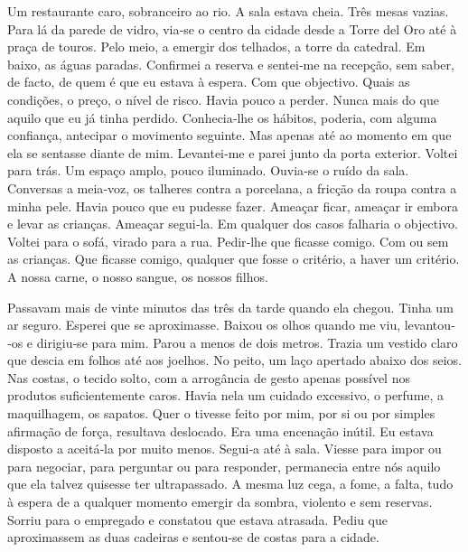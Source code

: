 Um restaurante caro, sobranceiro ao rio. A sala estava cheia. Três mesas
vazias. Para lá da parede de vidro, via­‑se o centro da cidade desde a
Torre del Oro até à praça de touros. Pelo meio, a emergir dos telhados,
a torre da catedral. Em baixo, as águas paradas. Confirmei a reserva e
sentei­‑me na recepção, sem saber, de facto, de quem é que eu estava à
espera. Com que objectivo. Quais as condições, o preço, o nível de
risco. Havia pouco a perder. Nunca mais do que aquilo que eu já tinha
perdido. Conhecia­‑lhe os hábitos, poderia, com alguma confiança,
antecipar o movimento seguinte. Mas apenas até ao momento em que ela se
sentasse diante de mim. Levantei­‑me e parei junto da porta exterior.
Voltei para trás. Um espaço amplo, pouco iluminado. Ouvia­‑se o ruído da
sala. Conversas a meia­‑voz, os talheres contra a porcelana, a fricção
da roupa contra a minha pele. Havia pouco que eu pudesse fazer. Ameaçar
ficar, ameaçar ir embora e levar as crianças. Ameaçar segui­‑la. Em
qualquer dos casos falharia o objectivo. Voltei para o sofá, virado para
a rua. Pedir­‑lhe que ficasse comigo. Com ou sem as crianças. Que
ficasse comigo, qualquer que fosse o critério, a haver um critério. A
nossa carne, o nosso sangue, os nossos filhos.

Passavam mais de vinte minutos das três da tarde quando ela chegou.
Tinha um ar seguro. Esperei que se aproximasse. Baixou os olhos quando
me viu, levantou­‑os e dirigiu­‑se para mim. Parou a menos de dois
metros. Trazia um vestido claro que descia em folhos até aos joelhos. No
peito, um laço apertado abaixo dos seios. Nas costas, o tecido solto,
com a arrogância de gesto apenas possível nos produtos suficientemente
caros. Havia nela um cuidado excessivo, o perfume, a maquilhagem, os
sapatos. Quer o tivesse feito por mim, por si ou por simples afirmação
de força, resultava deslocado. Era uma encenação inútil. Eu estava
disposto a aceitá­‑la por muito menos. Segui­‑a até à sala. Viesse para
impor ou para negociar, para perguntar ou para responder, permanecia
entre nós aquilo que ela talvez quisesse ter ultrapassado. A mesma luz
cega, a fome, a falta, tudo à espera de a qualquer momento emergir da
sombra, violento e sem reservas. Sorriu para o empregado e constatou que
estava atrasada. Pediu que aproximassem as duas cadeiras e sentou­‑se de
costas para a cidade.

